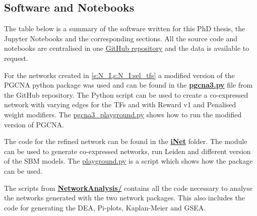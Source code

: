 \newpage

\begin{appendices}

\chapter{Software and Notebooks} \label{s:ap:software}

The table below is a summary of the software written for this PhD thesis, the Jupyter Notebooks and the corresponding sections. All the source code and notebooks are centralised in one \href{https://github.com/vladUng/PhD_thesis_exp/}{GitHub repository} and the data is available to request. 

For the networks created in \cref{s:N_I,s:N_I:sel_tfs} a modified version of the PGCNA python package \citep{Care2019-ij} was used and can be found in the \href{https://github.com/vladUng/PhD_thesis_exp/blob/03bb5b606d9a8bc59d88d6ab0843bac383b8a502/src/pgcna3.py}{\textbf{pgcna3.py}} file from the GitHub repository. The Python script can be used to create a co-expressed network with varying edges for the TFs and with Reward v1 and Penalised weight modifiers. The \href{https://github.com/vladUng/PhD_thesis_exp/blob/03bb5b606d9a8bc59d88d6ab0843bac383b8a502/src/pgcna3_playground.py}{pgcna3\_playground.py} shows how to run the modified version of PGCNA.

The code for the refined network can be found in the \href{https://github.com/vladUng/PhD_thesis_exp/tree/03bb5b606d9a8bc59d88d6ab0843bac383b8a502/src/iNet}{\textbf{iNet}} folder. The module can be used to generate co-expressed networks, run Leiden and different version of the SBM models. The \href{https://github.com/vladUng/PhD_thesis_exp/blob/03bb5b606d9a8bc59d88d6ab0843bac383b8a502/src/playground.py}{playground.py} is a script which shows how the package can be used.

The scripts from \href{https://github.com/vladUng/PhD_thesis_exp/tree/03bb5b606d9a8bc59d88d6ab0843bac383b8a502/src/NetworkAnalysis}{\textbf{NetworkAnalysis/}} contains all the code necessary to analyse the networks generated with the two network packages. This also includes the code for generating the DEA, Pi-plots, Kaplan-Meier and GSEA.


\end{appendices}
